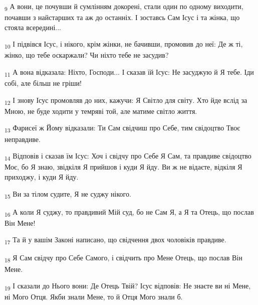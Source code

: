 \begin{tcolorbox}
\textsubscript{9} А вони, це почувши й сумлінням докорені, стали один по одному виходити, почавши з найстарших та аж до останніх. І зоставсь Сам Ісус і та жінка, що стояла всередині...
\end{tcolorbox}
\begin{tcolorbox}
\textsubscript{10} І підвівся Ісус, і нікого, крім жінки, не бачивши, промовив до неї: Де ж ті, жінко, що тебе оскаржали? Чи ніхто тебе не засудив?
\end{tcolorbox}
\begin{tcolorbox}
\textsubscript{11} А вона відказала: Ніхто, Господи... І сказав їй Ісус: Не засуджую й Я тебе. Іди собі, але більш не гріши!
\end{tcolorbox}
\begin{tcolorbox}
\textsubscript{12} І знову Ісус промовляв до них, кажучи: Я Світло для світу. Хто йде вслід за Мною, не буде ходити у темряві той, але матиме світло життя.
\end{tcolorbox}
\begin{tcolorbox}
\textsubscript{13} Фарисеї ж Йому відказали: Ти Сам свідчиш про Себе, тим свідоцтво Твоє неправдиве.
\end{tcolorbox}
\begin{tcolorbox}
\textsubscript{14} Відповів і сказав їм Ісус: Хоч і свідчу про Себе Я Сам, та правдиве свідоцтво Моє, бо Я знаю, звідкіля Я прийшов і куди Я йду. Ви ж не відаєте, відкіля Я приходжу, і куди Я йду.
\end{tcolorbox}
\begin{tcolorbox}
\textsubscript{15} Ви за тілом судите, Я не суджу нікого.
\end{tcolorbox}
\begin{tcolorbox}
\textsubscript{16} А коли Я суджу, то правдивий Мій суд, бо не Сам Я, а Я та Отець, що послав Він Мене!
\end{tcolorbox}
\begin{tcolorbox}
\textsubscript{17} Та й у вашім Законі написано, що свідчення двох чоловіків правдиве.
\end{tcolorbox}
\begin{tcolorbox}
\textsubscript{18} Я Сам свідчу про Себе Самого, і свідчить про Мене Отець, що послав Він Мене.
\end{tcolorbox}
\begin{tcolorbox}
\textsubscript{19} І сказали до Нього вони: Де Отець Твій? Ісус відповів: Не знаєте ви ні Мене, ні Мого Отця. Якби знали Мене, то й Отця Мого знали б.
\end{tcolorbox}
